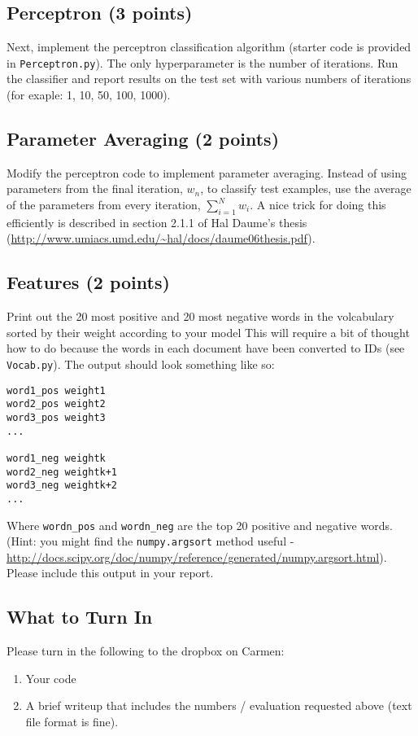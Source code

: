 \documentclass[12pt, letterpaper]{article}
\begin{document}
\subsection*{Perceptron (3 points)}
Next, implement the perceptron classification algorithm (starter code is provided in {\tt Perceptron.py}).
The only hyperparameter is the number of iterations.  Run the classifier and report results on the test set with
various numbers of iterations (for exaple: 1, 10, 50, 100, 1000).

\subsection*{Parameter Averaging (2 points)}
Modify the perceptron code to implement parameter averaging.  Instead of using parameters from the final iteration, $w_n$, to classify test examples, 
use the average of the parameters from every iteration, $\sum_{i=1}^N w_i$.  A nice trick for doing this efficiently is described in section 2.1.1 of Hal Daume's thesis
(\url{http://www.umiacs.umd.edu/~hal/docs/daume06thesis.pdf}).

\subsection*{Features (2 points)}
Print out the 20 most positive and 20 most negative words in
the volcabulary sorted by their weight according to your model
This will require a bit of thought how to do because the words in each document 
have been converted to IDs (see {\tt Vocab.py}).  The output should look something like so:
\begin{verbatim}
word1_pos weight1
word2_pos weight2
word3_pos weight3
...

word1_neg weightk
word2_neg weightk+1
word3_neg weightk+2
...
\end{verbatim}
Where {\tt wordn\_pos} and {\tt wordn\_neg} are the top 20 positive and negative words.  (Hint: you might find the {\tt numpy.argsort} method
useful - \url{http://docs.scipy.org/doc/numpy/reference/generated/numpy.argsort.html}).  Please include this output in your report.

\subsection*{What to Turn In}
Please turn in the following to the dropbox on Carmen:

\begin{enumerate}
  \item Your code
  \item A brief writeup that includes the numbers / evaluation requested above (text file format is fine).
\end{enumerate}
\end{document}
